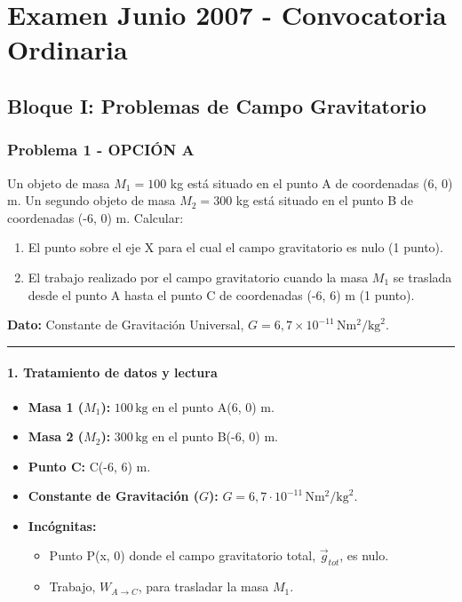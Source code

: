 \chapter{Examen Junio 2007 - Convocatoria Ordinaria}
\label{chap:2007_jun_ord}

\section{Bloque I: Problemas de Campo Gravitatorio}
\label{sec:grav_2007_jun_ord}

\subsection{Problema 1 - OPCIÓN A}
\label{subsec:1A_2007_jun_ord}

\begin{cajaenunciado}
Un objeto de masa $M_{1}=100$ kg está situado en el punto A de coordenadas (6, 0) m. Un segundo objeto de masa $M_{2}=300$ kg está situado en el punto B de coordenadas (-6, 0) m. Calcular:
\begin{enumerate}
    \item El punto sobre el eje X para el cual el campo gravitatorio es nulo (1 punto).
    \item El trabajo realizado por el campo gravitatorio cuando la masa $M_1$ se traslada desde el punto A hasta el punto C de coordenadas (-6, 6) m (1 punto).
\end{enumerate}
\textbf{Dato:} Constante de Gravitación Universal, $G=6,7\times10^{-11}\,\text{N}\text{m}^2/\text{kg}^2$.
\end{cajaenunciado}
\hrule

\subsubsection*{1. Tratamiento de datos y lectura}
\begin{itemize}
    \item \textbf{Masa 1 ($M_1$):} $100\,\text{kg}$ en el punto A(6, 0) m.
    \item \textbf{Masa 2 ($M_2$):} $300\,\text{kg}$ en el punto B(-6, 0) m.
    \item \textbf{Punto C:} C(-6, 6) m.
    \item \textbf{Constante de Gravitación ($G$):} $G = 6,7\cdot10^{-11}\,\text{N}\text{m}^2/\text{kg}^2$.
    \item \textbf{Incógnitas:}
    \begin{itemize}
        \item Punto P(x, 0) donde el campo gravitatorio total, $\vec{g}_{tot}$, es nulo.
        \item Trabajo, $W_{A \to C}$, para trasladar la masa $M_1$.
    \end{itemize}
\end{itemize}

